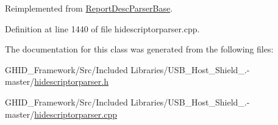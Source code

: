 \-Reimplemented from \hyperlink{class_report_desc_parser_base_ac1d6c015d9a2527bb2044e9a96fcaaf9}{\-Report\-Desc\-Parser\-Base}.



\-Definition at line 1440 of file hidescriptorparser.\-cpp.



\-The documentation for this class was generated from the following files\-:\begin{DoxyCompactItemize}
\item 
\-G\-H\-I\-D\-\_\-\-Framework/\-Src/\-Included Libraries/\-U\-S\-B\-\_\-\-Host\-\_\-\-Shield\-\_.-\/master/\hyperlink{hidescriptorparser_8h}{hidescriptorparser.\-h}\item 
\-G\-H\-I\-D\-\_\-\-Framework/\-Src/\-Included Libraries/\-U\-S\-B\-\_\-\-Host\-\_\-\-Shield\-\_.-\/master/\hyperlink{hidescriptorparser_8cpp}{hidescriptorparser.\-cpp}\end{DoxyCompactItemize}
